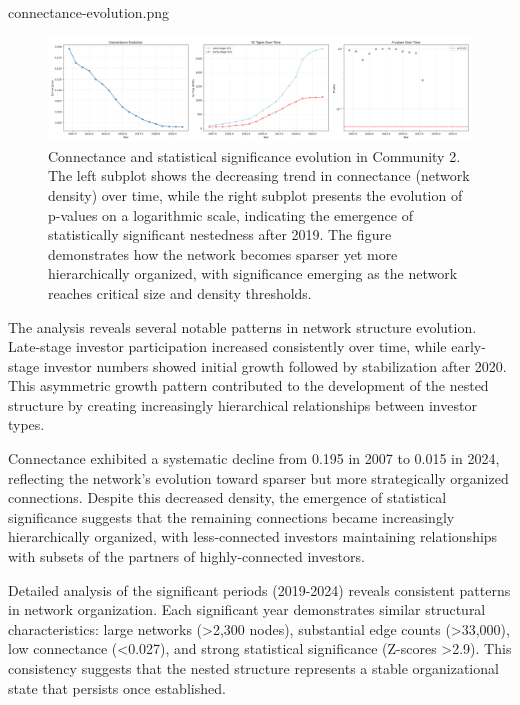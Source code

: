 connectance-evolution.png
\begin{figure}[htbp]
\hspace*{-1cm}\centering
\includegraphics[width=1.2\textwidth]{./assets/connectance-evolution.png}
\caption{Connectance and statistical significance evolution in Community 2. The left subplot shows the decreasing trend in connectance (network density) over time, while the right subplot presents the evolution of p-values on a logarithmic scale, indicating the emergence of statistically significant nestedness after 2019. The figure demonstrates how the network becomes sparser yet more hierarchically organized, with significance emerging as the network reaches critical size and density thresholds.}
\label{fig:connectance_evolution}
\end{figure}

The analysis reveals several notable patterns in network structure evolution. Late-stage investor participation increased consistently over time, while early-stage investor numbers showed initial growth followed by stabilization after 2020. This asymmetric growth pattern contributed to the development of the nested structure by creating increasingly hierarchical relationships between investor types.

Connectance exhibited a systematic decline from 0.195 in 2007 to 0.015 in 2024, reflecting the network's evolution toward sparser but more strategically organized connections. Despite this decreased density, the emergence of statistical significance suggests that the remaining connections became increasingly hierarchically organized, with less-connected investors maintaining relationships with subsets of the partners of highly-connected investors.

Detailed analysis of the significant periods (2019-2024) reveals consistent patterns in network organization. Each significant year demonstrates similar structural characteristics: large networks (>2,300 nodes), substantial edge counts (>33,000), low connectance (<0.027), and strong statistical significance (Z-scores >2.9). This consistency suggests that the nested structure represents a stable organizational state that persists once established.

